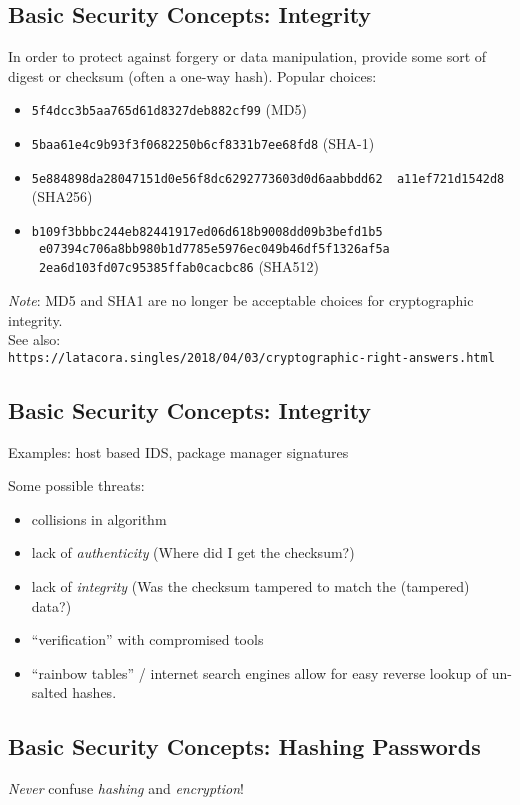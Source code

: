 \documentclass[xga]{xdvislides}
\begin{document}
\subsection{Basic Security Concepts: Integrity}
In order to protect against forgery or data manipulation, provide some sort of
digest or checksum (often a one-way hash).  Popular choices:

\begin{itemize}
	\item {\tt 5f4dcc3b5aa765d61d8327deb882cf99} (MD5)
	\item {\tt 5baa61e4c9b93f3f0682250b6cf8331b7ee68fd8} (SHA-1)
	\item {\tt 5e884898da28047151d0e56f8dc6292773603d0d6aabbdd62 \
                   a11ef721d1542d8} (SHA256)
	\item {\tt b109f3bbbc244eb82441917ed06d618b9008dd09b3befd1b5 \
                   e07394c706a8bb980b1d7785e5976ec049b46df5f1326af5a \
                   2ea6d103fd07c95385ffab0cacbc86} (SHA512)
\end{itemize}
\vspace{.25in}

{\em Note}: MD5 and SHA1 are no longer be acceptable
choices for cryptographic integrity.
\\

See also: \\
\verb+https://latacora.singles/2018/04/03/cryptographic-right-answers.html+

\subsection{Basic Security Concepts: Integrity}
Examples: host based IDS, package manager signatures

\vspace{.5in}
Some possible threats:
\begin{itemize}
	\item collisions in algorithm
	\item lack of {\em authenticity} (Where did I get the checksum?)
	\item lack of {\em integrity} (Was the checksum tampered to match the (tampered) data?)
	\item ``verification'' with compromised tools
	\item ``rainbow tables'' / internet search engines allow for easy reverse
		lookup of un-salted hashes.
\end{itemize}

\subsection{Basic Security Concepts: Hashing Passwords}
{\em Never} confuse {\em hashing} and {\em encryption}! \\
\end{document}
